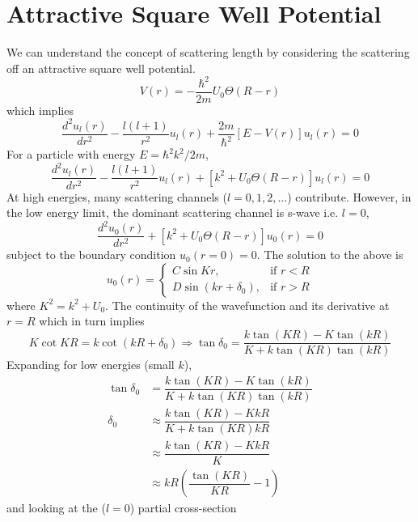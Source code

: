 \documentclass[aps,prb,onecolumn,notitlepage,showpacs,floatfix,superscriptaddress]{revtex4-1}
\begin{document}
\section{Attractive Square Well Potential}
We can understand the concept of scattering length by considering the scattering off an attractive square well potential.
\begin{equation}
V(r) = -\dfrac{\hbar^2}{2m}U_0 \Theta(R-r)
\end{equation}
which implies
\begin{equation}
\dfrac{d^2 u_l(r)}{dr^2} - \dfrac{l(l+1)}{r^2} u_l(r) +\dfrac{2m}{\hbar^2} [E-V(r)] u_l(r) =0
\end{equation}
For a particle with energy $E=\hbar^2 k^2/2m$,
\begin{equation}
\dfrac{d^2 u_l(r)}{dr^2} - \dfrac{l(l+1)}{r^2} u_l(r) + [k^2+U_0 \Theta(R-r)] u_l(r) =0
\end{equation}
At high energies, many scattering channels ($l=0,1,2,...$) contribute. However, in the low energy limit, the dominant scattering channel is s-wave i.e. $l=0$, 
\begin{equation}
\dfrac{d^2 u_0 (r)}{dr^2} + [k^2+ U_0 \Theta(R-r)] u_0 (r) =0
\end{equation}
subject to the boundary condition $u_0 (r=0)=0$. The solution to the above is
\[
    u_0 (r)= 
\begin{cases}
    C \sin Kr ,& \text{if } r<R \\
    D \sin (k r + \delta_0),              & \text{if } r> R
\end{cases}
\]
where $K^2 = k^2 + U_0$. The continuity of the wavefunction and its derivative at $r=R$ which in turn implies
\begin{equation}
K \cot KR = k \cot (kR+\delta_0) \Rightarrow \tan \delta_0 = \dfrac{k \tan (KR) - K \tan (kR)}{K + k\tan (KR) \tan(kR)}
\end{equation}
Expanding for low energies (small $k$),
\begin{equation}
\begin{split}
\tan \delta_0 &= \dfrac{k \tan (KR) - K \tan (kR)}{K + k\tan (KR) \tan(kR)} \\
\delta_0 &\approx  \dfrac{k \tan (KR) - K kR}{K + k\tan (KR) kR} \\
&\approx  \dfrac{k \tan (KR) - K kR}{K} \\
&\approx kR \left( \dfrac{\tan (KR)}{KR} -1 \right)
\end{split}
\end{equation}
and looking at the ($l=0$) partial cross-section
\end{document}
